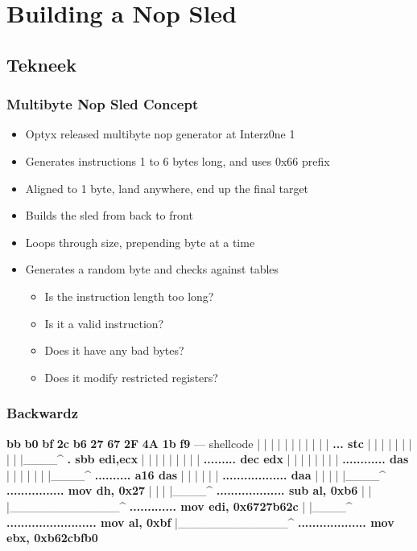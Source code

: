 \documentclass{beamer}
\newenvironment{sitemize}{\vspace{1mm}\begin{itemize}\itemsep 4pt\small}{\end{itemize}}
\begin{document}
\section{Building a Nop Sled}

\subsection{Tekneek}

\begin{frame}[t]
  \frametitle{Multibyte Nop Sled Concept}
  \begin{sitemize}
    \item Optyx released multibyte nop generator at Interz0ne 1
    \item Generates instructions 1 to 6 bytes long, and uses 0x66 prefix
    \item Aligned to 1 byte, land anywhere, end up the final target
  \end{sitemize}
  \begin{sitemize}
    \pause
    \item Builds the sled from back to front
    \item Loops through size, prepending byte at a time
    \item Generates a random byte and checks against tables
    \pause
    \begin{sitemize}
      \item Is the instruction length too long?
      \item Is it a valid instruction?
      \item Does it have any bad bytes?
      \item Does it modify restricted registers?
    \end{sitemize}
  \end{sitemize}
\end{frame}

\begin{frame}[fragile]
  \frametitle{Backwardz}
  {\footnotesize
  \begin{semiverbatim}
  \textbf<11>{bb} \textbf<10,11>{b0} \textbf<9,10,11>{bf} \textbf<8,9,11>{2c} \textbf<7,8,9,11>{b6} \textbf<6,7,9>{27} \textbf<5,9>{67} \textbf<4,5>{2F} \textbf<3>{4A} \textbf<2>{1b} \textbf<1,2>{f9} --- shellcode
  |  |  |  |  |  |  |  |  |  |  | \textbf<1>{... stc}
  |  |  |  |  |  |  |  |  |  |____^ \textbf<2>{. sbb edi,ecx}
  |  |  |  |  |  |  |  |  | \textbf<3>{......... dec edx}
  |  |  |  |  |  |  |  | \textbf<4>{............ das}
  |  |  |  |  |  |  |____^ \textbf<5>{.......... a16 das}
  |  |  |  |  |  | \textbf<6>{.................. daa}
  |  |  |  |  |____^ \textbf<7>{................ mov dh, 0x27}
  |  |  |  |____^ \textbf<8>{................... sub al, 0xb6}
  |  |  |_____________^ \textbf<9>{............. mov edi, 0x6727b62c}
  |  |____^ \textbf<10>{......................... mov al, 0xbf}
  |_____________^ \textbf<11>{................... mov ebx, 0xb62cbfb0}
\end{semiverbatim}
}
\end{frame}
\end{document}
